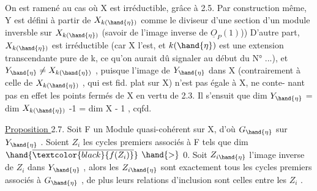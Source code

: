 
On est ramené au cas où X est irréductible, grâce à 2.5. Par construction
même, Y est défini à partir de $X_{k(\hand{\eta})}$ comme le diviseur d'une section
d'un module inversble sur $X_{k(\hand{\eta})}$ (savoir de l'image inverse de $\underline{O}_P(1)$))
D'autre part, $X_{k(\hand{\eta})}$ est irréductible (car X l'est, et $k(\hand{\eta})$ est une
 extension transcendante pure de k, ce qu'on aurait dû signaler au début du
N° ...), et $Y_{\hand{\eta}} \neq X_{k(\hand{\eta})}$ , puisque l'image de $Y_{\hand{\eta}}$ dans X (contrairement
à celle de $X_{k(\hand{\eta})}$ , qui est fid. plat sur X) n'est pas égale à X, ne conte-%
nant pas en effet les points fermés de X en vertu de 2.3. Il s'ensuit que
dim $Y_{\hand{\eta}}$ = dim $X_{k(\hand{\eta})}$ -1  = dim X - 1 , cqfd.

\uline{Proposition }2.7. Soit F un Module quasi-cohérent sur X, d'où $G_{\hand{\eta}}$ sur $Y_{\hand{\eta}}$ .
Soient $Z_i$ les cycles premiers associés à F tels que dim $\hand{\overline{\textcolor{black}{f(Z_i)}}}$ $\hand{>}$ 0. Soit
$Z_{i\hand{\eta}}$ l'image inverse de $Z_i$ dans $Y_{\hand{\eta}}$ , alors les $Z_{i\hand{\eta}}$ sont exactement tous
les cycles premiers associés à $G_{\hand{\eta}}$ , de plus leurs relations d'inclusion
sont celles entre les $Z_i$ .

